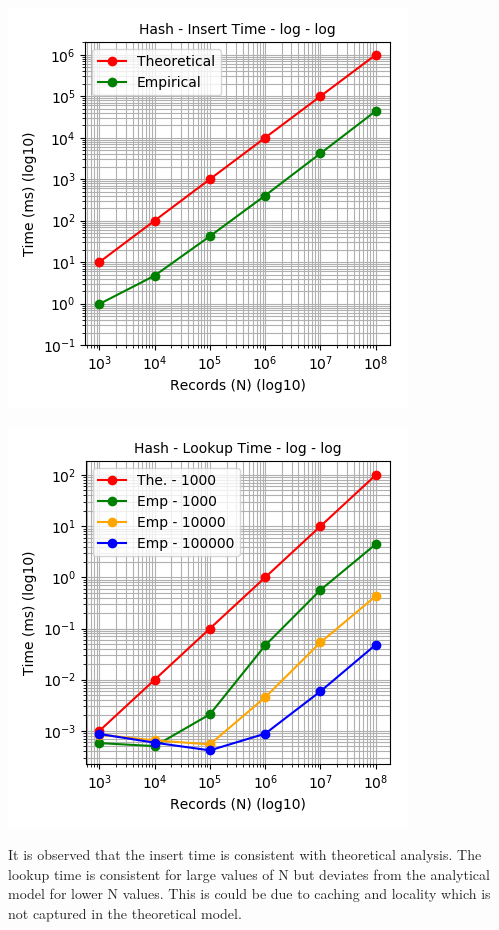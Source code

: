 \documentclass[11pt,a4paper,oneside]{article}
\begin{document}
	\begin{center}
		\includegraphics[scale=0.6]{1.png}		
	\end{center}

    \begin{center}
    	\includegraphics[scale=0.6]{2.png}		
    \end{center}
	
	It is observed that the insert time is consistent with theoretical analysis. The lookup time is consistent for large values of N but deviates from the analytical model for lower N values. This is could be due to caching and locality which is not captured in the theoretical model.
	
\end{document}
